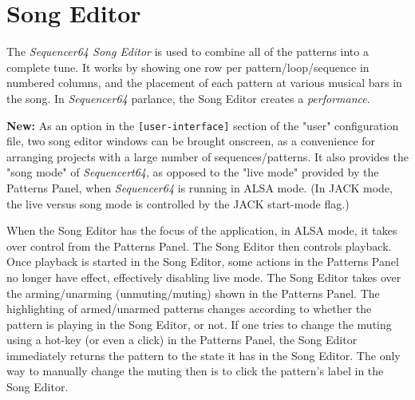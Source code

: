 %
%
%

\section{Song Editor}
\label{sec:seq64_song_editor}

   The \textsl{Sequencer64 Song Editor} is used to combine all of the patterns
   into a complete tune.  It works by showing one row per
   pattern/loop/sequence in numbered columns, and the placement of each
   pattern at various musical bars in the song.
   In \textsl{Sequencer64} parlance, the Song Editor creates a
   \textsl{performance}.

   \textbf{New:}
   As an option in the \texttt{[user-interface]}
   section of the "user" configuration file, two song editor windows can be
   brought onscreen, as a convenience for arranging projects with a large
   number of sequences/patterns.
   It also provides the "song mode" of \textsl{Sequencert64},
   as opposed to the "live mode" provided by the Patterns Panel, when
   \textsl{Sequencer64} is running in ALSA mode.
   (In JACK mode, the live versus song mode is controlled by the JACK start-mode
   flag.)

   When the Song Editor has the focus of the application, in ALSA mode, it
   takes over control from the Patterns Panel.  The Song Editor then
   controls playback.  Once playback is started in the Song Editor, some actions
   in the Patterns Panel no longer have effect, effectively disabling live
   mode.  The Song Editor takes over the arming/unarming (unmuting/muting)
   shown in the Patterns Panel.  The highlighting of armed/unarmed patterns
   changes according to whether the pattern is playing in the Song Editor, or
   not.  If one tries to change the muting using a hot-key (or even a click) in
   the Patterns Panel, the Song Editor immediately returns the pattern to the
   state it has in the Song Editor.  The only way to manually change the muting
   then is to click the pattern's label in the Song Editor.
   
